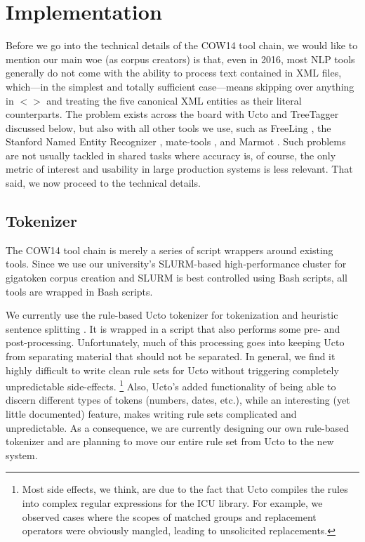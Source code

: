 \documentclass[11pt]{article}
\begin{document}
\section{Implementation}
\label{sec:implementation}

Before we go into the technical details of the COW14 tool chain, we would like to mention our main woe (as corpus creators) is that, even in 2016, most NLP tools generally do not come with the ability to process text contained in XML files, which---in the simplest and totally sufficient case---means skipping over anything in $<>$ and treating the five canonical XML entities as their literal counterparts.
The problem exists across the board with Ucto and TreeTagger discussed below, but also with all other tools we use, such as FreeLing \cite{CarrerasEa2004}, the Stanford Named Entity Recognizer \cite{FaruquiPado2010}, mate-tools \cite{BohnetNivre2012}, and Marmot \cite{MuellerEa2013}.
Such problems are not usually tackled in shared tasks where accuracy is, of course, the only metric of interest and usability in large production systems is less relevant.
That said, we now proceed to the technical details.

\subsection{Tokenizer}
\label{sec:tokenizer}

The COW14 tool chain is merely a series of script wrappers around existing tools.
Since we use our university's SLURM-based high-performance cluster for gigatoken corpus creation and SLURM is best controlled using Bash scripts, all tools are wrapped in Bash scripts.

We currently use the rule-based Ucto tokenizer for tokenization and heuristic sentence splitting \cite{ucto}.
It is wrapped in a script that also performs some pre- and post-processing.
Unfortunately, much of this processing goes into keeping Ucto from separating material that should not be separated.
In general, we find it highly difficult to write clean rule sets for Ucto without triggering completely unpredictable side-effects.%
\footnote{Most side effects, we think, are due to the fact that Ucto compiles the rules into complex regular expressions for the ICU library.
For example, we observed cases where the scopes of matched groups and replacement operators were obviously mangled, leading to unsolicited replacements.}
Also, Ucto's added functionality of being able to discern different types of tokens (numbers, dates, etc.), while an interesting (yet little documented) feature, makes writing rule sets complicated and unpredictable.
As a consequence, we are currently designing our own rule-based tokenizer and are planning to move our entire rule set from Ucto to the new system.
\end{document}
